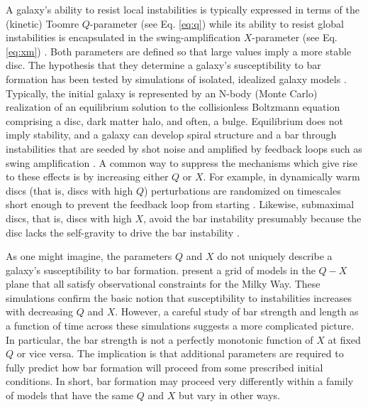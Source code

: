 A galaxy's ability to resist local instabilities is typically
expressed in terms of the (kinetic) Toomre $Q$-parameter {(see Eq. \eqref{eq:q})}
\citep{ToomreParameter} while its ability to resist global
instabilities is encapsulated in the swing-amplification $X$-parameter {(see Eq. \eqref{eq:xm})}
\citep{GoldreichTremaine1978,GoldreichTremaine1979}.  Both parameters
are defined so that large values imply a more stable disc.  The
hypothesis that they determine a galaxy's susceptibility to bar
formation has been tested by simulations of isolated, idealized galaxy
models \citep{PeeblesOstriker1973, ZangHohlBars1978,
  CombesSandersBars1981,Sellwood1981}.  Typically, the initial galaxy
is represented by an N-body {(Monte Carlo)} realization of an equilibrium solution to
the collisionless Boltzmann equation comprising a disc, dark matter
halo, and often, a bulge.  Equilibrium does not imply
stability, and a galaxy can develop spiral structure and a bar through
instabilities that are seeded by shot noise
\citep{EfstathiouShotNoise} and amplified by feedback loops such as
swing amplification \citep{Sellwood2013}. {A common way to suppress the mechanisms
which give rise to these effects is} by increasing either $Q$ or $X$.  For
example, in dynamically warm discs (that is, discs with high $Q$)
perturbations are randomized on timescales short enough to prevent the
feedback loop from starting \citep{AthanassoulaSellwood1986}.
Likewise, submaximal discs, that is, discs with high $X$, avoid the
bar instability presumably because the disc lacks the self-gravity to
drive the bar instability \citep{EfstathiouShotNoise,
  ChristodoulouStability1995, Sellwood2013}.

As one might imagine, the parameters $Q$ and $X$ do not uniquely
describe a galaxy's susceptibility to bar formation.
\citet{WPDGalactICSReference} present a grid of models in the $Q-X$
plane that all satisfy observational constraints for the Milky Way.
These simulations confirm the basic notion that susceptibility to
instabilities increases with decreasing $Q$ and $X$.  However, a
careful study of bar strength and length as a function of time across
these simulations suggests a more complicated picture.  In particular,
the bar strength is not a perfectly monotonic function of $X$ at fixed
$Q$ or vice versa.  The implication is that additional parameters are
required to fully predict how bar formation will proceed from some
prescribed initial conditions.  In short, bar formation may
proceed very differently within a family of models that have the same
$Q$ and $X$ but vary in other ways.

